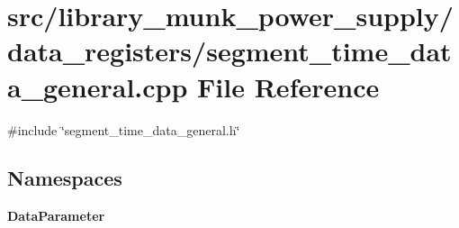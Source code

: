 \section{src/library\+\_\+munk\+\_\+power\+\_\+supply/data\+\_\+registers/segment\+\_\+time\+\_\+data\+\_\+general.cpp File Reference}
\label{segment__time__data__general_8cpp}
{\ttfamily \#include \char`\"{}segment\+\_\+time\+\_\+data\+\_\+general.\+h\char`\"{}}\newline
\subsection*{Namespaces}
\begin{DoxyCompactItemize}
\item 
 \textbf{ Data\+Parameter}
\end{DoxyCompactItemize}
